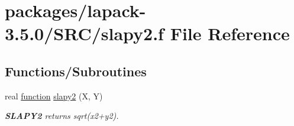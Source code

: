 \hypertarget{slapy2_8f}{}\section{packages/lapack-\/3.5.0/\+S\+R\+C/slapy2.f File Reference}
\label{slapy2_8f}
\subsection*{Functions/\+Subroutines}
\begin{DoxyCompactItemize}
\item 
real \hyperlink{afunc_8m_a7b5e596df91eadea6c537c0825e894a7}{function} \hyperlink{group__auxOTHERauxiliary_gabfcdad5f1d5d0193f7285e018824aa66}{slapy2} (X, Y)
\begin{DoxyCompactList}\small\item\em {\bfseries S\+L\+A\+P\+Y2} returns sqrt(x2+y2). \end{DoxyCompactList}\end{DoxyCompactItemize}
